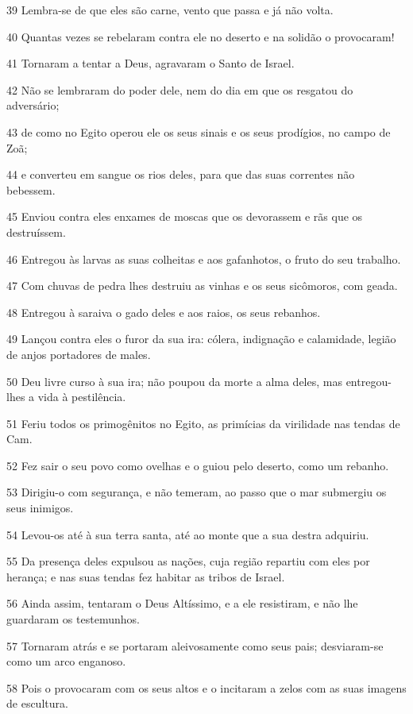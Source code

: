 \par 39 Lembra-se de que eles são carne, vento que passa e já não volta.
\par 40 Quantas vezes se rebelaram contra ele no deserto e na solidão o provocaram!
\par 41 Tornaram a tentar a Deus, agravaram o Santo de Israel.
\par 42 Não se lembraram do poder dele, nem do dia em que os resgatou do adversário;
\par 43 de como no Egito operou ele os seus sinais e os seus prodígios, no campo de Zoã;
\par 44 e converteu em sangue os rios deles, para que das suas correntes não bebessem.
\par 45 Enviou contra eles enxames de moscas que os devorassem e rãs que os destruíssem.
\par 46 Entregou às larvas as suas colheitas e aos gafanhotos, o fruto do seu trabalho.
\par 47 Com chuvas de pedra lhes destruiu as vinhas e os seus sicômoros, com geada.
\par 48 Entregou à saraiva o gado deles e aos raios, os seus rebanhos.
\par 49 Lançou contra eles o furor da sua ira: cólera, indignação e calamidade, legião de anjos portadores de males.
\par 50 Deu livre curso à sua ira; não poupou da morte a alma deles, mas entregou-lhes a vida à pestilência.
\par 51 Feriu todos os primogênitos no Egito, as primícias da virilidade nas tendas de Cam.
\par 52 Fez sair o seu povo como ovelhas e o guiou pelo deserto, como um rebanho.
\par 53 Dirigiu-o com segurança, e não temeram, ao passo que o mar submergiu os seus inimigos.
\par 54 Levou-os até à sua terra santa, até ao monte que a sua destra adquiriu.
\par 55 Da presença deles expulsou as nações, cuja região repartiu com eles por herança; e nas suas tendas fez habitar as tribos de Israel.
\par 56 Ainda assim, tentaram o Deus Altíssimo, e a ele resistiram, e não lhe guardaram os testemunhos.
\par 57 Tornaram atrás e se portaram aleivosamente como seus pais; desviaram-se como um arco enganoso.
\par 58 Pois o provocaram com os seus altos e o incitaram a zelos com as suas imagens de escultura.
